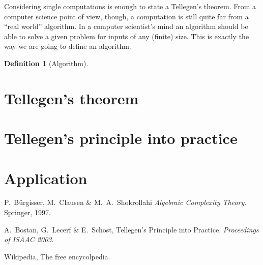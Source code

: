 \documentclass{article}
\newtheorem{definition}{Definition}
\begin{document}
  Considering single computations is enough to state a Tellegen's
  theorem. From a computer science point of view, though, a
  computation is still quite far from a ``real world'' algorithm. In a
  computer scientist's mind an algorithm should be able to solve a
  given problem for inputs of any (finite) size. This is exactly the
  way we are going to define an algorithm.

  \begin{definition}[Algorithm]
    
  \end{definition}



  \section{Tellegen's theorem}
  
  \section{Tellegen's principle into practice}
  
  \section{Application}


  
  \begin{thebibliography}{1}
    
  P.~Bürgisser, M.~Clausen \& M.~A.~Shokrollahi
    \emph{Algebraic Complexity Theory}.
    Springer, 1997.
    
  A.~Bostan, G.~Lecerf \& E.~Schost,
    Tellegen's Principle into Practice.
    \emph{Proceedings of ISAAC 2003}.

  Wikipedia, The free encycolpedia.
  
  \end{thebibliography}
\end{document}
